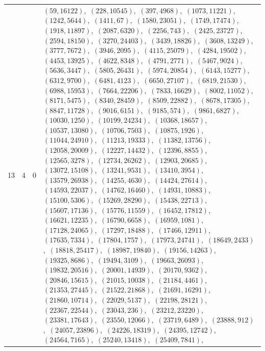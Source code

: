 \documentclass[11pt]{article}
\begin{document}
\begin{longtable}{@{}rrl>{\raggedright\arraybackslash}p{}@{}}
13 & 4 & $0$ & $(59,16122)$,\allowbreak\ $(228,10545)$,\allowbreak\ $(397,4968)$,\allowbreak\ $(1073,11221)$,\allowbreak\ $(1242,5644)$,\allowbreak\ $(1411,67)$,\allowbreak\ $(1580,23051)$,\allowbreak\ $(1749,17474)$,\allowbreak\ $(1918,11897)$,\allowbreak\ $(2087,6320)$,\allowbreak\ $(2256,743)$,\allowbreak\ $(2425,23727)$,\allowbreak\ $(2594,18150)$,\allowbreak\ $(3270,24403)$,\allowbreak\ $(3439,18826)$,\allowbreak\ $(3608,13249)$,\allowbreak\ $(3777,7672)$,\allowbreak\ $(3946,2095)$,\allowbreak\ $(4115,25079)$,\allowbreak\ $(4284,19502)$,\allowbreak\ $(4453,13925)$,\allowbreak\ $(4622,8348)$,\allowbreak\ $(4791,2771)$,\allowbreak\ $(5467,9024)$,\allowbreak\ $(5636,3447)$,\allowbreak\ $(5805,26431)$,\allowbreak\ $(5974,20854)$,\allowbreak\ $(6143,15277)$,\allowbreak\ $(6312,9700)$,\allowbreak\ $(6481,4123)$,\allowbreak\ $(6650,27107)$,\allowbreak\ $(6819,21530)$,\allowbreak\ $(6988,15953)$,\allowbreak\ $(7664,22206)$,\allowbreak\ $(7833,16629)$,\allowbreak\ $(8002,11052)$,\allowbreak\ $(8171,5475)$,\allowbreak\ $(8340,28459)$,\allowbreak\ $(8509,22882)$,\allowbreak\ $(8678,17305)$,\allowbreak\ $(8847,11728)$,\allowbreak\ $(9016,6151)$,\allowbreak\ $(9185,574)$,\allowbreak\ $(9861,6827)$,\allowbreak\ $(10030,1250)$,\allowbreak\ $(10199,24234)$,\allowbreak\ $(10368,18657)$,\allowbreak\ $(10537,13080)$,\allowbreak\ $(10706,7503)$,\allowbreak\ $(10875,1926)$,\allowbreak\ $(11044,24910)$,\allowbreak\ $(11213,19333)$,\allowbreak\ $(11382,13756)$,\allowbreak\ $(12058,20009)$,\allowbreak\ $(12227,14432)$,\allowbreak\ $(12396,8855)$,\allowbreak\ $(12565,3278)$,\allowbreak\ $(12734,26262)$,\allowbreak\ $(12903,20685)$,\allowbreak\ $(13072,15108)$,\allowbreak\ $(13241,9531)$,\allowbreak\ $(13410,3954)$,\allowbreak\ $(13579,26938)$,\allowbreak\ $(14255,4630)$,\allowbreak\ $(14424,27614)$,\allowbreak\ $(14593,22037)$,\allowbreak\ $(14762,16460)$,\allowbreak\ $(14931,10883)$,\allowbreak\ $(15100,5306)$,\allowbreak\ $(15269,28290)$,\allowbreak\ $(15438,22713)$,\allowbreak\ $(15607,17136)$,\allowbreak\ $(15776,11559)$,\allowbreak\ $(16452,17812)$,\allowbreak\ $(16621,12235)$,\allowbreak\ $(16790,6658)$,\allowbreak\ $(16959,1081)$,\allowbreak\ $(17128,24065)$,\allowbreak\ $(17297,18488)$,\allowbreak\ $(17466,12911)$,\allowbreak\ $(17635,7334)$,\allowbreak\ $(17804,1757)$,\allowbreak\ $(17973,24741)$,\allowbreak\ $(18649,2433)$,\allowbreak\ $(18818,25417)$,\allowbreak\ $(18987,19840)$,\allowbreak\ $(19156,14263)$,\allowbreak\ $(19325,8686)$,\allowbreak\ $(19494,3109)$,\allowbreak\ $(19663,26093)$,\allowbreak\ $(19832,20516)$,\allowbreak\ $(20001,14939)$,\allowbreak\ $(20170,9362)$,\allowbreak\ $(20846,15615)$,\allowbreak\ $(21015,10038)$,\allowbreak\ $(21184,4461)$,\allowbreak\ $(21353,27445)$,\allowbreak\ $(21522,21868)$,\allowbreak\ $(21691,16291)$,\allowbreak\ $(21860,10714)$,\allowbreak\ $(22029,5137)$,\allowbreak\ $(22198,28121)$,\allowbreak\ $(22367,22544)$,\allowbreak\ $(23043,236)$,\allowbreak\ $(23212,23220)$,\allowbreak\ $(23381,17643)$,\allowbreak\ $(23550,12066)$,\allowbreak\ $(23719,6489)$,\allowbreak\ $(23888,912)$,\allowbreak\ $(24057,23896)$,\allowbreak\ $(24226,18319)$,\allowbreak\ $(24395,12742)$,\allowbreak\ $(24564,7165)$,\allowbreak\ $(25240,13418)$,\allowbreak\ $(25409,7841)$,\allowbreak\ 
\end{longtable}
\end{document}
